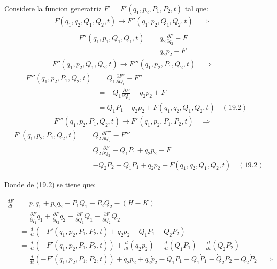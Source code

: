 \documentclass[a4paper]{article}
\begin{document}
\begin{answer}[Punto 19]
        \item Considere la funcion generatriz $F' = F'(q_1, p_2, P_1, P_2, t)$ tal que:
        \begin{align*}
            F(q_1, q_2, Q_1, Q_2, t)  \rightarrow F''(q_1, p_2, Q_1, Q_2, t) \quad \Rightarrow\\
        \end{align*} 
        \begin{align*}F''(q_1, p_1, Q_1, Q_1, t) &= q_2 \frac{\partial F}{\partial q_2}  - F\\
            &= q_2 p_2 - F
        \end{align*}
        \begin{align*}
            F''(q_1,p_2,Q_1,Q_2,t) \rightarrow F'''(q_1, p_2, P_1, Q_2, t) \quad \Rightarrow 
        \end{align*}
        \begin{align*}
            \quad F'''(q_1,p_2,P_1,Q_2,t) &= Q_1 \frac{\partial F''}{\partial Q_1}  - F''\\
            &= -Q_1 \frac{\partial F}{\partial Q_1}  - q_2 p_2 + F \\
            &= Q_1 P_1 - q_2 p_2 + F(q_1, q_2, Q_1, Q_2, t) \quad (19.2)
        \end{align*}
        \begin{align*}
            F'''(q_1,p_2,P_1,Q_2,t) \rightarrow F'(q_1, p_2, P_1, P_2, t) \quad \Rightarrow 
        \end{align*}
        \begin{align*}
            \quad F'(q_1,p_2,P_1,Q_2,t) &= Q_2 \frac{\partial F'''}{\partial Q_2}  - F'''\\
            &= Q_2 \frac{\partial F}{\partial Q_2}  -Q_1 P_1 +  q_2 p_2 - F \\
            &= -Q_2 P_2 - Q_1 P_1 + q_2 p_2 - F(q_1, q_2, Q_1, Q_2, t) \quad (19.2)
        \end{align*}

        Donde de (19.2) se tiene que:

        \begin{align*}
            \frac{dF}{dt}  &=p_1 \dot q_1 + p_2 \dot q_2 - P_1\dot Q_1- P_2 \dot Q_2 - (H - K)\\
            &= \frac{\partial F}{\partial q_1} \dot q_1 + \frac{\partial F}{\partial q_2} \dot q_2- \frac{\partial F}{\partial Q_1}\dot Q_1- \frac{\partial F}{\partial Q_2} \dot Q_2\\
            &= \frac d{dt}\left(-F'(q_1, p_2, P_1, P_2, t) + q_2 p_2 - Q_1 P_1 - Q_2P_2\right)\\
            &= \frac d{dt}\left(-F'(q_1, p_2, P_1, P_2, t) \right) + \frac d{dt}\left(q_2 p_2 \right) - \frac d{dt}\left(Q_1 P_1 \right) - \frac d{dt}\left(Q_2 P_2 \right)\\
            &= \frac d{dt}\left(-F'(q_1, p_2, P_1, P_2, t) \right) + \dot q_2 p_2 + q_2 \dot p_2 - \dot Q_1 P_1 - Q_1 \dot P_1 - \dot Q_2 P_2 - Q_2 \dot P_2 \quad \Rightarrow\\
        \end{align*}
        

\end{answer}
\end{document}
